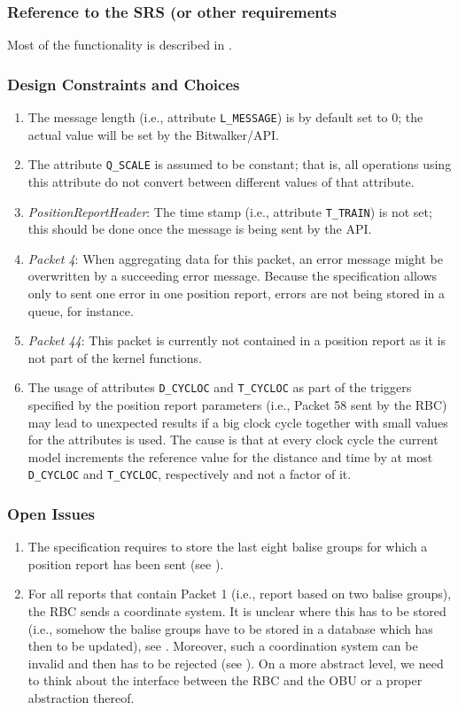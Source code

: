 \subsubsection{Reference to the SRS (or other requirements}
Most of the functionality is described in \cite[Chapter~3.6.5]{subset-026}.

\subsubsection{Design Constraints and Choices}
\begin{enumerate}
	\item The message length (i.e., attribute \verb+L_MESSAGE+) is by default set to 0; the actual value will be set by the Bitwalker/API.
	\item The attribute \verb+Q_SCALE+ is assumed to be constant; that is, all operations using this attribute do not convert between different values of that attribute.
	\item \textit{PositionReportHeader}: The time stamp (i.e., attribute \verb+T_TRAIN+) is not set; this should be done once the message is being sent by the API.
	\item \textit{Packet 4}: When aggregating data for this packet, an error message might be overwritten by a succeeding error message. Because the specification allows only to sent one error in one position report, errors are not being stored in a queue, for instance.
	\item \textit{Packet 44}: This packet is currently not contained in a position report as it is not part of the kernel functions.
	\item The usage of attributes \verb+D_CYCLOC+ and \verb+T_CYCLOC+ as part of the triggers specified by the position report parameters (i.e., Packet 58 sent by the RBC) may lead to unexpected results if a big clock cycle together with small values for the attributes is used. The cause is that at every clock cycle the current model increments the reference value for the distance and time by at most \verb+D_CYCLOC+ and \verb+T_CYCLOC+, respectively and not a factor of it.
\end{enumerate}

\subsubsection{Open Issues}
\begin{enumerate}
	\item The specification requires to store the last eight balise groups for which a position report has been sent (see \cite[Chapter~3.6.2.2.2.c]{subset-026}).
	\item For all reports that contain Packet 1 (i.e., report based on two balise groups), the RBC sends a coordinate system. It is unclear where this has to be stored (i.e., somehow the balise groups have to be stored in a database which has then to be updated), see \cite[Chapter~3.4.2.3.3.6]{subset-026}. Moreover, such a coordination system can be invalid and then has to be rejected (see \cite[Chapter~3.4.2.3.3.7-8]{subset-026}). On a more abstract level, we need to think about the interface between the RBC and the OBU or a proper abstraction thereof.
\end{enumerate}
